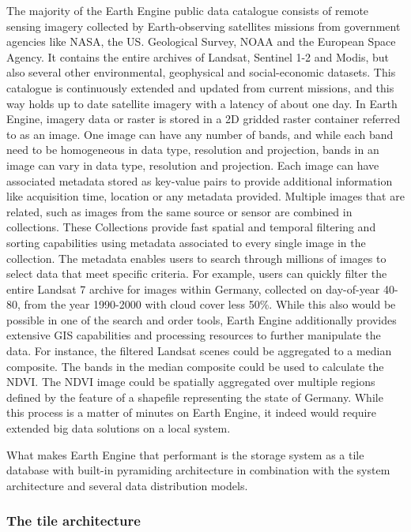 The majority of the Earth Engine public data catalogue consists of remote sensing imagery collected by Earth-observing satellites missions from government agencies like NASA, the US. Geological Survey, NOAA and the European Space Agency. It contains the entire archives of Landsat, Sentinel 1-2 and Modis, but also several other environmental, geophysical and social-economic datasets. This catalogue is continuously extended and updated from current missions, and this way holds up to date satellite imagery with a latency of about one day.
In Earth Engine, imagery data or raster is stored in a 2D gridded raster container referred to as an image. One image can have any number of bands, and while each band need to be homogeneous in data type, resolution and projection, bands in an image can vary in data type, resolution and projection. Each image can have associated metadata stored as key-value pairs to provide additional information like acquisition time, location or any metadata provided.
Multiple images that are related, such as images from the same source or sensor are combined in collections. These Collections provide fast spatial and temporal filtering and sorting capabilities using metadata associated to every single image in the collection. The metadata enables users to search through millions of images to select data that meet specific criteria. For example, users can quickly filter the entire Landsat 7 archive for images within Germany, collected on day-of-year 40-80, from the year 1990-2000 with cloud cover less 50\%. While this also would be possible in one of the search and order tools, Earth Engine additionally provides extensive GIS capabilities and processing resources to further manipulate the data.
For instance, the filtered Landsat scenes could be aggregated to a median composite. The bands in the median composite could be used to calculate the NDVI. The NDVI image could be spatially aggregated over multiple regions defined by the feature of a shapefile representing the state of Germany. While this process is a matter of minutes on Earth Engine, it indeed would require extended big data solutions on a local system.

What makes Earth Engine that performant is the storage system as a tile database with built-in pyramiding architecture in combination with the system architecture and several data distribution models.

\subsubsection{The tile architecture}


